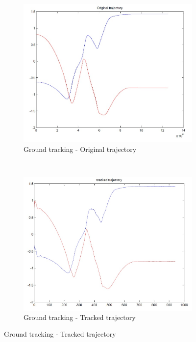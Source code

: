 \begin{figure}
	\centering
	\begin{subfigure}[b]{0.4\linewidth}
		\centering
		\includegraphics[width=\linewidth]{../Images/c3/sim2_traj_ori}
		\caption{Ground tracking - Original trajectory}
		\label{fig:sim2_traj_ori}
	\end{subfigure}
	~
	\begin{subfigure}[b]{0.4\linewidth}
		\centering
		\includegraphics[width=\linewidth]{../Images/c3/sim2_traj_track}
		\caption{Ground tracking - Tracked trajectory}
		\label{fig:sim2_traj_track}
	\end{subfigure}

\end{figure}


